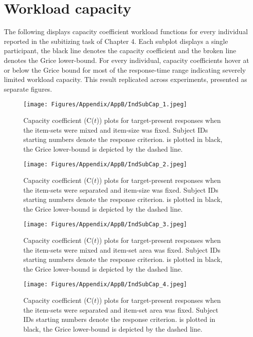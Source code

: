 \section{Workload capacity}
The following displays capacity coefficient workload functions for every individual reported in the subitizing task of Chapter 4. Each subplot displays a single participant, the black line denotes the capacity coefficient and the broken line denotes the Grice lower-bound. For every individual, capacity coefficients hover at or below the Grice bound for most of the response-time range indicating severely limited workload capacity. This result replicated across experiments, presented as separate figures. 

\begin{figure}[ht]
\centering \texttt{[image: Figures/Appendix/AppB/IndSubCap\_1.jpeg]}
\caption{Capacity coefficient (C($t$)) plots for target-present responses when the item-sets were mixed and item-size was fixed. Subject IDs starting numbers denote the response criterion. \Ct is plotted in black, the Grice lower-bound is depicted by the dashed line.}
\label{fig:AppB_subCap1}
\end{figure}

\begin{figure}[ht]
\centering \texttt{[image: Figures/Appendix/AppB/IndSubCap\_2.jpeg]}
\caption{Capacity coefficient (C($t$)) plots for target-present responses when the item-sets were separated and item-size was fixed. Subject IDs starting numbers denote the response criterion. \Ct is plotted in black, the Grice lower-bound is depicted by the dashed line.}
\label{fig:AppB_subCap2}
\end{figure}

\begin{figure}[ht]
\centering \texttt{[image: Figures/Appendix/AppB/IndSubCap\_3.jpeg]}
\caption{Capacity coefficient (C($t$)) plots for target-present responses when the item-sets were mixed and item-set area was fixed. Subject IDs starting numbers denote the response criterion. \Ct is plotted in black, the Grice lower-bound is depicted by the dashed line.}
\label{fig:AppB_subCap3}
\end{figure}

\begin{figure}[ht]
\centering \texttt{[image: Figures/Appendix/AppB/IndSubCap\_4.jpeg]}
\caption{Capacity coefficient (C($t$)) plots for target-present responses when the item-sets were separated and item-set area was fixed. Subject IDs starting numbers denote the response criterion. \Ct is plotted in black, the Grice lower-bound is depicted by the dashed line.}
\label{fig:AppB_subCap4}
\end{figure}

